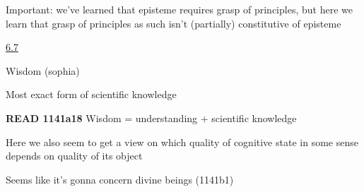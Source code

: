 \documentclass[11pt]{article}
\begin{document}
\noindent Important: we've learned that episteme requires grasp of principles, but here we learn that grasp of principles as such isn't (partially) constitutive of episteme
\vspace*{2mm}

\noindent\underline{6.7}
\vspace*{4mm}

\noindent Wisdom (sophia)
\vspace*{2mm}

\noindent Most exact form of scientific knowledge
\vspace*{2mm}

\noindent\textbf{READ 1141a18} Wisdom = understanding + scientific knowledge
\vspace*{2mm}

\noindent Here we also seem to get a view on which quality of cognitive state in some sense depends on quality of its object
\vspace*{2mm}

\noindent Seems like it's gonna concern divine beings (1141b1)
\end{document}
